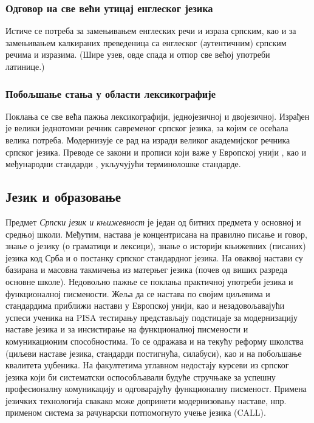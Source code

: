 {\begin{multicols}{2}
\subsubsection {Одговор на све већи утицај енглеског језика}
   
 Истиче се потреба за замењивањем енглеских речи и израза српским, као и за замењивањем калкираних преведеница са енглеског (аутентичним) српским речима и изразима. (Шире узев, овде спада и отпор све већој употреби латинице.)
 
 \subsubsection {Побољшање стања у области лексикографије}
   
 Поклања се све већа пажња лексикографији, једнојезичној и двојезичној. Израђен је велики једнотомни речник савременог српског језика, за којим се осећала велика потреба. Модернизује се рад на изради великог академијског речника српског језика.
Преводе се закони и прописи који важе у Европској унији \cite{SEIO}, као и међународни стандарди \cite{ISS}, укључујући терминолошке стандарде.
 
 \subsection {Језик и образовање}
   
 
Предмет \textit{Српски језик и књижевност} је један од битних предмета у основној и средњој  школи. Међутим, настава је концентрисана на правилно писање и говор, знање о језику (о граматици и лексици), знање о историји књижевних (писаних) језика код Срба и о постанку српског стандардног језика. На оваквој настави су базирана и масовна такмичења из матерњег језика (почев од виших разреда основне школе). Недовољно пажње се поклања практичној употреби језика и функционалној писмености. 
Жеља да се настава по својим циљевима и стандардима приближи настави у Европској 
унији, као и   незадовољавајући успеси ученика на PISA тестирању представљају подстицаје за модернизацију наставе језика и за инсистирање на функционалној писмености и комуникационим способностима. То се одражава и на текућу реформу  школства (циљеви наставе језика, стандарди постигнућа, силабуси), као и на побољшање квалитета уџбеника. На факултетима углавном недостају курсеви из српског језика који би систематски оспособљавали будуће стручњаке за успешну професионалну комуникацију и одговарајућу функционалну писменост. 
Примена језичких технологија свакако може допринети  модернизовању наставе, нпр. применом система за рачунарски потпомогнуто учење језика (CALL). 
 

\end{multicols}}
